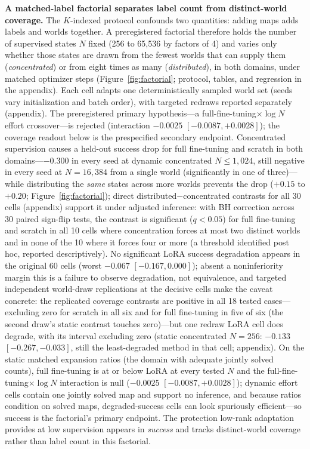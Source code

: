 \documentclass[letterpaper]{article} %
\begin{document}
\textbf{A matched-label factorial separates label count from distinct-world coverage.} The $K$-indexed protocol confounds two quantities: adding maps adds labels and worlds together. A preregistered factorial therefore holds the number of supervised states $N$ fixed (256 to 65{,}536 by factors of 4) and varies only whether those states are drawn from the fewest worlds that can supply them (\emph{concentrated}) or from eight times as many (\emph{distributed}), in both domains, under matched optimizer steps (Figure~\ref{fig:factorial}; protocol, tables, and regression in the appendix). Each cell adapts one deterministically sampled world set (seeds vary initialization and batch order), with targeted redraws reported separately (appendix). The preregistered primary hypothesis---a full-fine-tuning$\times\log N$ effort crossover---is rejected (interaction $-0.0025$ $[-0.0087, +0.0028]$); the coverage readout below is the prespecified secondary endpoint. Concentrated supervision causes a held-out success drop for full fine-tuning and scratch in both domains---$-0.300$ in every seed at dynamic concentrated $N \leq 1{,}024$, still negative in every seed at $N{=}16{,}384$ from a single world (significantly in one of three)---while distributing the \emph{same} states across more worlds prevents the drop ($+0.15$ to $+0.20$; Figure~\ref{fig:factorial}); direct distributed$-$concentrated contrasts for all 30 cells (appendix) support it under adjusted inference: with BH correction across 30 paired sign-flip tests, the contrast is significant ($q{<}0.05$) for full fine-tuning and scratch in all 10 cells where concentration forces at most two distinct worlds and in none of the 10 where it forces four or more (a threshold identified post hoc, reported descriptively). No significant LoRA success degradation appears in the original 60 cells (worst $-0.067$ $[-0.167, 0.000]$); absent a noninferiority margin this is a failure to observe degradation, not equivalence, and targeted independent world-draw replications at the decisive cells make the caveat concrete: the replicated coverage contrasts are positive in all 18 tested cases---excluding zero for scratch in all six and for full fine-tuning in five of six (the second draw's static contrast touches zero)---but one redraw LoRA cell does degrade, with its interval excluding zero (static concentrated $N{=}256$: $-0.133$ $[-0.267, -0.033]$, still the least-degraded method in that cell; appendix). On the static matched expansion ratios (the domain with adequate jointly solved counts), full fine-tuning is at or below LoRA at every tested $N$ and the full-fine-tuning$\times\log N$ interaction is null ($-0.0025$ $[-0.0087, +0.0028]$); dynamic effort cells contain one jointly solved map and support no inference, and because ratios condition on solved maps, degraded-success cells can look spuriously efficient---so success is the factorial's primary endpoint. The protection low-rank adaptation provides at low supervision appears in \emph{success} and tracks distinct-world coverage rather than label count in this factorial.
\end{document}
